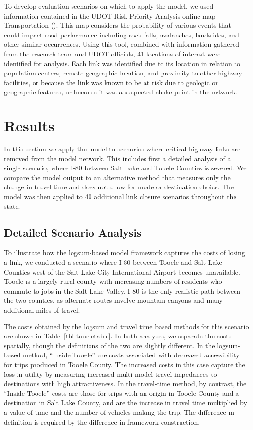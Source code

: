 \documentclass[]{ascelike-new}
\begin{document}
To develop evaluation scenarios on which to apply the model, we used
information contained in the UDOT Risk Priority Analysis online map
Transportation (). This map considers the
probability of various events that could impact road performance
including rock falls, avalanches, landslides, and other similar
occurrences. Using this tool, combined with information gathered from
the research team and UDOT officials, 41 locations of interest were
identified for analysis. Each link was identified due to its location in
relation to population centers, remote geographic location, and
proximity to other highway facilities, or because the link was known to
be at risk due to geologic or geographic features, or because it was a
suspected choke point in the network.


\section{Results}\label{sec-results}

In this section we apply the model to scenarios where critical highway
links are removed from the model network. This includes first a detailed
analysis of a single scenario, where I-80 between Salt Lake and Tooele
Counties is severed. We compare the model output to an alternative
method that measures only the change in travel time and does not allow
for mode or destination choice. The model was then applied to 40
additional link closure scenarios throughout the state.

\subsection{Detailed Scenario
Analysis}\label{detailed-scenario-analysis}

To illustrate how the logsum-based model framework captures the costs of
losing a link, we conducted a scenario where I-80 between Tooele and
Salt Lake Counties west of the Salt Lake City International Airport
becomes unavailable. Tooele is a largely rural county with increasing
numbers of residents who commute to jobs in the Salt Lake Valley. I-80
is the only realistic path between the two counties, as alternate routes
involve mountain canyons and many additional miles of travel.

The costs obtained by the logsum and travel time based methods for this
scenario are shown in Table~\ref{tbl-tooeletable}. In both analyses, we
separate the costs spatially, though the definitions of the two are
slightly different. In the logsum-based method, ``Inside Tooele'' are
costs associated with decreased accessibility for trips produced in
Tooele County. The increased costs in this case capture the loss in
utility by measuring increased multi-model travel impedances to
destinations with high attractiveness. In the travel-time method, by
contrast, the ``Inside Tooele'' costs are those for trips with an origin
in Tooele County and a destination in Salt Lake County, and are the
increase in travel time multiplied by a value of time and the number of
vehicles making the trip. The difference in definition is required by
the difference in framework construction.
\end{document}
